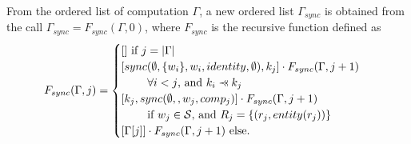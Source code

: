 \begin{mydef}
From the ordered list of computation $\Gamma$, a new ordered list $\Gamma_{sync}$ is obtained from the call $\Gamma_{sync} = F_{sync}(\Gamma,0)$, where $F_{sync}$ is the recursive function defined as
\begin{equation*}
F_{sync}(\Gamma,j) = 
\begin{cases} 	[] \mbox{ if }j=|\Gamma|\\
				[sync(\emptyset,\{w_i\},w_i,identity,\emptyset), k_j] \cdot F_{sync}(\Gamma,j+1)\\
				\text{ } \qquad \forall i<j \text{, and }k_i \pprec k_j\\
				[k_j, sync(\emptyset,,w_j,comp_j)] \cdot F_{sync}(\Gamma,j+1)\\ 
				\text{ } \qquad \mbox{if } w_j \in \mathcal{S} \text{, and } R_j=\{(r_j,entity(r_j))\}\\
				[\Gamma[j]] \cdot F_{sync}(\Gamma,j+1) \text{ else}.
\end{cases}
\end{equation*}
\end{mydef}




